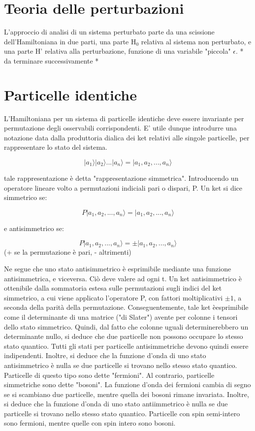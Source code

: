 \documentclass{report}
\begin{document}
\section{Teoria delle perturbazioni}
L'approccio di analisi di un sistema perturbato parte da una scissione dell'Hamiltoniana in due parti, una parte H$_0$ relativa al sistema non perturbato, e una parte H' relativa alla perturbazione, funzione di una variabile "piccola" $\epsilon$.
* da terminare successivamente *

\section{Particelle identiche}
L'Hamiltoniana per un sistema di particelle identiche deve essere invariante per permutazione degli osservabili corrispondenti.
E' utile dunque introdurre una notazione data dalla produttoria dialica dei ket relativi alle singole particelle, per rappresentare lo stato del sistema.

\begin{equation}
  |a_1\rangle |a_2\rangle ...|a_n\rangle =|a_1,a_2,...,a_n\rangle
\end{equation}

tale rappresentazione è detta "rappresentazione simmetrica".
Introducendo un operatore lineare volto a permutazioni indiciali pari o dispari, P.
Un ket si dice simmetrico se:

\begin{equation}
  P|a_1,a_2,...,a_n\rangle =|a_1,a_2,...,a_n\rangle
\end{equation}

e antisimmetrico se:

\begin{equation}
  P|a_1,a_2,...,a_n\rangle =\pm|a_1,a_2,...,a_n\rangle
\end{equation}
(+ se la permutazione è pari, - altrimenti)

Ne segue che uno stato antisimmetrico è esprimibile mediante una funzione antisimmetrica, e viceversa.
Ciò deve valere ad ogni t.
Un ket antisimmetrico è ottenibile dalla sommatoria estesa sulle permutazioni sugli indici del ket simmetrico, a cui viene applicato l'operatore P, con fattori moltiplicativi $\pm 1$, a
seconda della parità della permutazione.
Conseguentemente, tale ket èesprimibile come il determinante di una matrice ("di Slater") avente per colonne i tensori dello stato simmetrico.
Quindi, dal fatto che colonne uguali determinerebbero un determinante nullo, si deduce che due particelle non possono occupare lo stesso stato quantico.
Tutti gli stati per particelle antisimmetriche devono quindi essere indipendenti.
Inoltre, si deduce che la funzione d'onda di uno stato antisimmetrico è nulla se due particelle si trovano nello stesso stato quantico.
Particelle di questo tipo sono dette "fermioni".
Al contrario, particelle simmetriche sono dette "bosoni".
La funzione d'onda dei fermioni cambia di segno se si scambiano due particelle, mentre quella dei bosoni rimane invariata.
Inoltre, si deduce che la funzione d'onda di uno stato antiimmetrico è nulla se due particelle si trovano nello stesso stato quantico.
Particelle con spin semi-intero sono fermioni, mentre quelle con spin intero sono bosoni.
\end{document}
